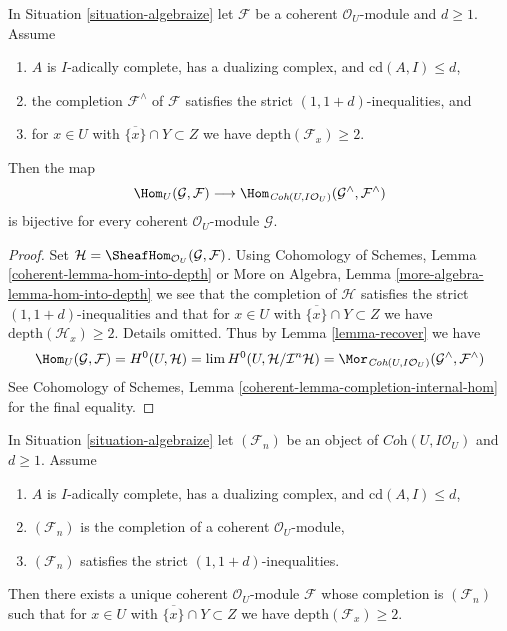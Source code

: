 \begin{lemma}
\label{lemma-fully-faithful-inequalities}
In Situation \ref{situation-algebraize} let $\mathcal{F}$ be a
coherent $\mathcal{O}_U$-module and $d \geq 1$. Assume
\begin{enumerate}
\item $A$ is $I$-adically complete, has a dualizing complex, and
$\text{cd}(A, I) \leq d$,
\item the completion $\mathcal{F}^\wedge$ of $\mathcal{F}$
satisfies the strict $(1, 1 + d)$-inequalities, and
\item for $x \in U$ with $\overline{\{x\}} \cap Y \subset Z$
we have $\text{depth}(\mathcal{F}_x) \geq 2$.
\end{enumerate}
Then the map
$$
\Hom_U(\mathcal{G}, \mathcal{F})
\longrightarrow
\Hom_{\textit{Coh}(U, I\mathcal{O}_U)}(\mathcal{G}^\wedge, \mathcal{F}^\wedge)
$$
is bijective for every coherent $\mathcal{O}_U$-module $\mathcal{G}$. 
\end{lemma}

\begin{proof}
Set $\mathcal{H} = \SheafHom_{\mathcal{O}_U}(\mathcal{G}, \mathcal{F})$.
Using Cohomology of Schemes, Lemma
\ref{coherent-lemma-hom-into-depth} or
More on Algebra, Lemma \ref{more-algebra-lemma-hom-into-depth}
we see that the completion of $\mathcal{H}$
satisfies the strict $(1, 1 + d)$-inequalities and that for
$x \in U$ with $\overline{\{x\}} \cap Y \subset Z$
we have $\text{depth}(\mathcal{H}_x) \geq 2$. Details omitted.
Thus by Lemma \ref{lemma-recover} we have
$$
\Hom_U(\mathcal{G}, \mathcal{F}) =
H^0(U, \mathcal{H}) =
\lim H^0(U, \mathcal{H}/\mathcal{I}^n\mathcal{H}) =
\Mor_{\textit{Coh}(U, I\mathcal{O}_U)}
(\mathcal{G}^\wedge, \mathcal{F}^\wedge)
$$
See Cohomology of Schemes, Lemma \ref{coherent-lemma-completion-internal-hom}
for the final equality.
\end{proof}

\begin{lemma}
\label{lemma-construct-unique}
In Situation \ref{situation-algebraize} let $(\mathcal{F}_n)$ be an
object of $\textit{Coh}(U, I\mathcal{O}_U)$ and $d \geq 1$. Assume
\begin{enumerate}
\item $A$ is $I$-adically complete, has a dualizing complex, and
$\text{cd}(A, I) \leq d$,
\item $(\mathcal{F}_n)$ is the completion of a coherent $\mathcal{O}_U$-module,
\item $(\mathcal{F}_n)$ satisfies the strict $(1, 1 + d)$-inequalities.
\end{enumerate}
Then there exists a unique coherent $\mathcal{O}_U$-module $\mathcal{F}$
whose completion is $(\mathcal{F}_n)$ such that for
$x \in U$ with $\overline{\{x\}} \cap Y \subset Z$
we have $\text{depth}(\mathcal{F}_x) \geq 2$.
\end{lemma}

